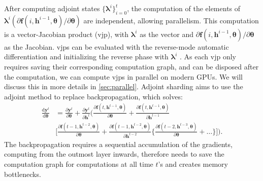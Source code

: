 \documentclass{article}
\newcommand{\vjp}{\mathrm{vjp}}
\newcommand{\diff}{\mathrm{d}}
\newcommand{\blambda}{\boldsymbol{\lambda}}
\newcommand{\bphi}{\boldsymbol{\phi}}
\newcommand{\ka}[1]{{\color{brown} Kavosh: #1 }}
\begin{document}

After computing adjoint states $\{\blambda^i\}_{i=0}^t$, the computation of the elements of $\blambda^i(\partial \mathbf{f}(i,\mathbf{h}^{i-1},\boldsymbol{\theta})/\partial\boldsymbol{\theta})$ are independent, allowing parallelism. This computation is a vector-Jacobian product ($\vjp$), with $\blambda^i$ as the vector and $\partial \mathbf{f}(i,\mathbf{h}^{i-1},\boldsymbol{\theta})/\partial\boldsymbol{\theta}$ as the Jacobian. $\vjp$s can be evaluated with the reverse-mode automatic differentiation and initializing the reverse phase with $\blambda^i$ \cite{baydin2018ad}. As each $\vjp$ only requires saving their corresponding computation graph, and can be disposed after the computation, we can compute $\vjp$s in parallel on modern GPUs. We will discuss this in more details in \autoref{sec:parallel}.
Adjoint sharding aims to use the adjoint method to replace backpropagation, which solves:
\begin{align*}
\label{eqn:backprop}
    \frac{\diff \mathbf{y}^t}{\diff \boldsymbol{\theta}} &= \frac{\partial \mathbf{y}^t}{\partial \boldsymbol{\theta}} + \frac{\partial \mathbf{y}^t}{\partial \mathbf{h}^t}\biggl( \frac{\partial \mathbf{f}(t,\mathbf{h}^{t-1},\boldsymbol{\theta})}{\partial \boldsymbol{\theta}}+\frac{\partial \mathbf{f}(t,\mathbf{h}^{t-1},\boldsymbol{\theta})}{\partial \boldsymbol{h}^{t-1}}\\
    &\biggl [\frac{\partial \mathbf{f}(t-1,\mathbf{h}^{t-2},\boldsymbol{\theta})}{\partial \boldsymbol{\theta}}+\frac{\partial \mathbf{f}(t-1,\mathbf{h}^{t-2},\boldsymbol{\theta})}{\partial \boldsymbol{h}^{t-2}} \biggl \{\frac{\partial \mathbf{f}(t-2,\mathbf{h}^{t-3},\boldsymbol{\theta})}{\partial \boldsymbol{\theta}}+\dots \biggl \} \biggl ] \biggl ).
\end{align*}
The backpropagation requires a sequential accumulation of the gradients, computing from the outmost layer inwards, therefore needs to save the computation graph for computations at all time $t$'s and creates memory bottlenecks. %
\end{document}
